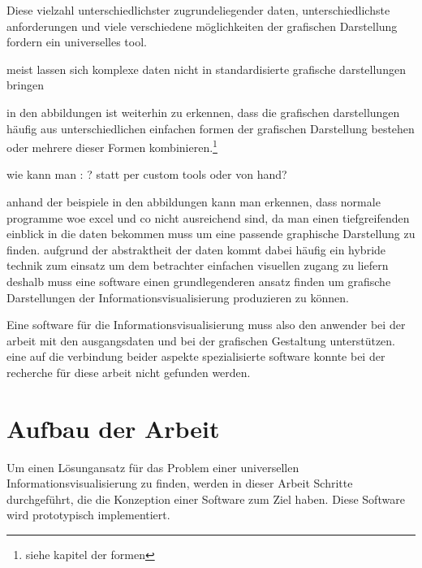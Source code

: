 \documentclass[a4paper, 12pt, DIVcalc, onepage, pdftex, headsepline, footsepline]{scrreprt}
\begin{document}
Diese 
vielzahl unterschiedlichster zugrundeliegender daten,
unterschiedlichste anforderungen und viele verschiedene möglichkeiten der grafischen Darstellung
fordern ein universelles tool.

meist lassen sich komplexe daten nicht in standardisierte grafische darstellungen bringen

in den abbildungen ist weiterhin zu erkennen, dass die grafischen darstellungen häufig aus 
unterschiedlichen einfachen formen der grafischen Darstellung bestehen oder mehrere dieser Formen
kombinieren.\footnote{siehe kapitel der formen}

wie kann man : ? statt per custom tools oder von hand?

anhand der beispiele in den abbildungen kann man erkennen, dass normale programme woe excel und co nicht ausreichend sind,
da man einen tiefgreifenden einblick in die daten bekommen muss um eine passende graphische Darstellung zu finden.
aufgrund der abstraktheit der daten kommt dabei häufig ein hybride technik zum einsatz um dem betrachter einfachen
visuellen zugang zu liefern
deshalb muss eine software einen grundlegenderen ansatz finden um grafische Darstellungen der Informationsvisualisierung
produzieren zu können.


Eine software für die Informationsvisualisierung muss also den anwender bei der arbeit mit den ausgangsdaten und bei der 
grafischen Gestaltung unterstützen. eine auf die verbindung beider aspekte spezialisierte software konnte bei der
recherche für diese arbeit nicht gefunden werden.

\section{Aufbau der Arbeit}
Um einen Lösungansatz für das Problem einer universellen Informationsvisualisierung
zu finden, werden in dieser Arbeit Schritte durchgeführt, die die Konzeption einer Software zum Ziel haben.
Diese Software wird prototypisch implementiert.
\end{document}
